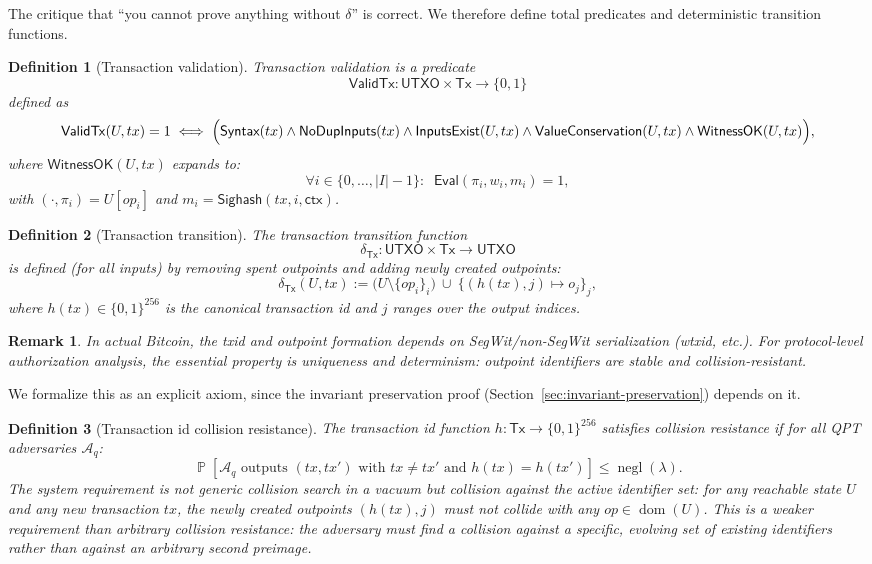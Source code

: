 \documentclass[11pt]{article}
\newtheorem{definition}{Definition}
\newtheorem{remark}{Remark}
\newcommand{\bits}{\{0,1\}}
\newcommand{\negl}{\operatorname{negl}}
\newcommand{\Prob}{\operatorname{\mathbb{P}}}
\newcommand{\dom}{\operatorname{dom}}
\newcommand{\Aq}{\mathcal{A}_q}
\newcommand{\Tx}{\mathsf{Tx}}
\newcommand{\UTXO}{\mathsf{UTXO}}
\newcommand{\Eval}{\mathsf{Eval}}
\newcommand{\Sighash}{\mathsf{Sighash}}
\newcommand{\ValidTx}{\mathsf{ValidTx}}
\newcommand{\DeltaTx}{\delta_{\Tx}}
\begin{document}
The critique that ``you cannot prove anything without $\delta$'' is correct.
We therefore define total predicates and deterministic transition functions.

\begin{definition}[Transaction validation]\label{def:validtx}
Transaction validation is a predicate
\[
\ValidTx:\UTXO \times \Tx \to \bits
\]
defined as
\[
\ValidTx(U,tx)=1 \iff
\Bigl(\textsf{Syntax}(tx)\wedge \textsf{NoDupInputs}(tx)\wedge \textsf{InputsExist}(U,tx)\wedge \textsf{ValueConservation}(U,tx)\wedge \textsf{WitnessOK}(U,tx)\Bigr),
\]
where $\textsf{WitnessOK}(U,tx)$ expands to:
\[
\forall i \in \{0,\dots,|I|-1\}:\;\;
\Eval(\pi_i, w_i, m_i)=1,
\]
with $(\cdot,\pi_i)=U[op_i]$ and $m_i=\Sighash(tx,i,\textsf{ctx})$.
\end{definition}

\begin{definition}[Transaction transition]
The transaction transition function
\[
\DeltaTx:\UTXO \times \Tx \to \UTXO
\]
is defined (for all inputs) by removing spent outpoints and adding newly created outpoints:
\[
\DeltaTx(U,tx) := \bigl(U \setminus \{op_i\}_{i}\bigr)\ \cup\ \{(h(tx),j)\mapsto o_j\}_{j},
\]
where $h(tx)\in\bits^{256}$ is the canonical transaction id and $j$ ranges over the output indices.
\end{definition}

\begin{remark}
In actual Bitcoin, the txid and outpoint formation depends on SegWit/non-SegWit serialization (wtxid, etc.).
For protocol-level authorization analysis, the essential property is uniqueness and determinism: outpoint identifiers are stable and collision-resistant.
\end{remark}

We formalize this as an explicit axiom, since the invariant preservation proof (Section~\ref{sec:invariant-preservation}) depends on it.

\begin{definition}[Transaction id collision resistance]\label{def:txid-cr}
The transaction id function $h:\Tx\to\bits^{256}$ satisfies \emph{collision resistance} if for all QPT adversaries $\Aq$:
\[
\Prob[\Aq \text{ outputs } (tx,tx') \text{ with } tx\neq tx' \text{ and } h(tx)=h(tx')] \le \negl(\lambda).
\]
The system requirement is not generic collision search in a vacuum but collision against the \emph{active identifier set}: for any reachable state $U$ and any new transaction $tx$, the newly created outpoints $(h(tx),j)$ must not collide with any $op\in\dom(U)$.
This is a weaker requirement than arbitrary collision resistance: the adversary must find a collision against a specific, evolving set of existing identifiers rather than against an arbitrary second preimage.
\end{definition}
\end{document}

